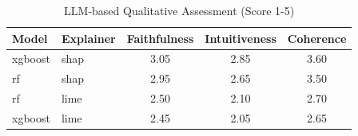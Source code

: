 \begin{table}[htbp]
\centering
\caption{LLM-based Qualitative Assessment (Score 1-5)}
\label{tab:llm_eval}
\begin{tabular}{llccc}
\toprule
Model & Explainer & Faithfulness & Intuitiveness & Coherence \\
\midrule
xgboost & shap & 3.05 & 2.85 & 3.60 \\
rf & shap & 2.95 & 2.65 & 3.50 \\
rf & lime & 2.50 & 2.10 & 2.70 \\
xgboost & lime & 2.45 & 2.05 & 2.65 \\
\bottomrule
\end{tabular}
\end{table}